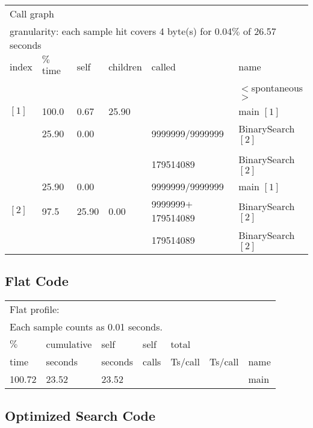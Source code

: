 \documentclass[11pt]{article}
\begin{document}
\begin{enumerate}
\begin{table}[H]
\begin{tabular}{  l  l  l  l  l  l  }
\multicolumn{6}{l}{Call graph}\\
\multicolumn{6}{l}{granularity: each sample hit covers 4 byte(s) for 0.04$\%$ of 26.57 seconds}\\
index  & $\%$ time &   self & children  &  called  &   name \\
     & & & & &                                            $<$spontaneous$>$\\
$[1]$  &  100.0 &  0.67   &25.90     &           &       main $[1]$\\
                 &    25.90 & 0.00  & &9999999/9999999  &   BinarySearch $[2]$ \\
\hline \\
        &&&&                     179514089                 &                 BinarySearch $[2]$ \\
            &         25.90  &  0.00 &&9999999/9999999   &  main $[1]$\\
$[2]$    &97.5   & 25.90   & 0.00 &9999999$+$179514089& BinarySearch $[2]$\\
                &&&&                                               179514089 &BinarySearch $[2]$\\
\hline 
\end{tabular}
\end{table}

\subsection*{Flat Code}

\begin{table}[H]
\begin{tabular}{l l l l l l l}
\multicolumn{7}{l}{Flat profile:}\\
\multicolumn{7}{l}{Each sample counts as 0.01 seconds.}\\
 $\%$  & cumulative &  self        &      self   &  total     &      &    \\
 time   & seconds     & seconds  &   calls    & Ts/call  & Ts/call & name    \\   
100.72  &   23.52 &   23.52      & & & &                       main\\
\end{tabular}
 \end{table}


\subsection*{Optimized Search Code}


\end{enumerate}
\end{document}
